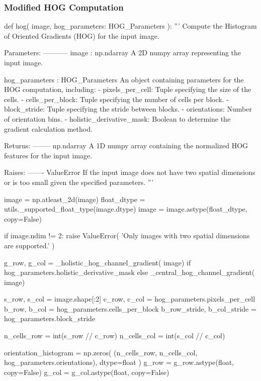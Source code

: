 \subsubsection{Modified HOG Computation}\label{appendix:hog}
\begin{pythoncode}
def hog(
        image,
        hog_parameters: HOG_Parameters
):
    '''
    Compute the Histogram of Oriented Gradients (HOG) for the input image.

    Parameters:
    -----------
    image : np.ndarray
        A 2D numpy array representing the input image.
    
    hog_parameters : HOG_Parameters
        An object containing parameters for the HOG computation, including:
        - pixels_per_cell: Tuple specifying the size of the cells.
        - cells_per_block: Tuple specifying the number of cells per block.
        - block_stride: Tuple specifying the stride between blocks.
        - orientations: Number of orientation bins.
        - holistic_derivative_mask: Boolean to determine the gradient calculation method.
    
    Returns:
    --------
    np.ndarray
        A 1D numpy array containing the normalized HOG features for the input image.
    
    Raises:
    -------
    ValueError
        If the input image does not have two spatial dimensions or is too small
        given the specified parameters.
    '''

    image = np.atleast_2d(image)
    float_dtype = utils._supported_float_type(image.dtype)
    image = image.astype(float_dtype, copy=False)

    if image.ndim != 2:
        raise ValueError(
            'Only images with two spatial dimensions are supported.'
        )

    g_row, g_col = _holistic_hog_channel_gradient(
        image) if hog_parameters.holistic_derivative_mask else _central_hog_channel_gradient(
        image)

    s_row, s_col = image.shape[:2]
    c_row, c_col = hog_parameters.pixels_per_cell
    b_row, b_col = hog_parameters.cells_per_block
    b_row_stride, b_col_stride = hog_parameters.block_stride

    n_cells_row = int(s_row // c_row)
    n_cells_col = int(s_col // c_col)

    orientation_histogram = np.zeros(
        (n_cells_row, n_cells_col, hog_parameters.orientations), dtype=float
    )
    g_row = g_row.astype(float, copy=False)
    g_col = g_col.astype(float, copy=False)


\end{pythoncode}
